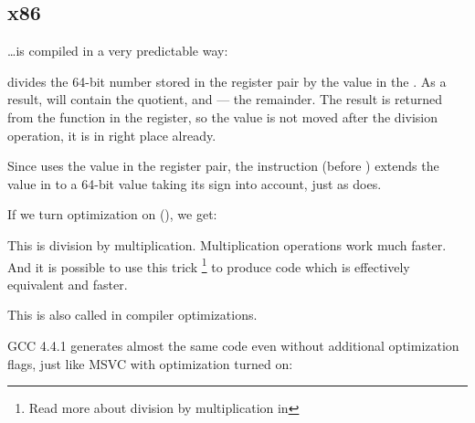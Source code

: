 ﻿\subsection{x86}

\dots is compiled in a very predictable way:




\IDIV divides the 64-bit number stored in the  register pair by the value in the \ECX.
As a result, \EAX will contain the \gls{quotient}, and \EDX --- the remainder.
The result is returned from the \ttf function in the \EAX register, 
so the value is not moved after the division 
operation, it is in right place already.

Since \IDIV uses the value in the  register pair, the  instruction (before \IDIV) extends 
the value in \EAX to a 64-bit value taking its sign into account, just as \MOVSX does.

If we turn optimization on (\Ox), we get:



This is division by multiplication. Multiplication operations work much faster. 
And it is possible to use this trick
\footnote{Read more about division by multiplication in }
to produce code which is effectively equivalent and faster.

This is also called  in compiler optimizations.

GCC 4.4.1 generates almost the same code even without additional optimization flags, 
just like MSVC with optimization turned on:


